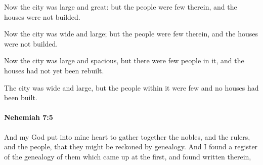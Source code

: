 			Now the city was large and great: but the people were few therein, and the houses were not builded.

			\begin{versebox}
					\item[BHS] 
					\item[LXX] 
					\item[ASV] Now the city was wide and large; but the people were few therein, and the houses were not builded.
					\item[NIV] Now the city was large and spacious, but there were few people in it, and the houses had not yet been rebuilt.
					\item[NRSV] The city was wide and large, but the people within it were few and no houses had been built.
			\end{versebox}

		\paragraph{Nehemiah 7:5} %
			\label{NEHEMIAH-7-5}

			And my God put into mine heart to gather together the nobles, and the rulers, and the people, that they might be reckoned by genealogy. And I found a register of the genealogy of them which came up at the first, and found written therein,

